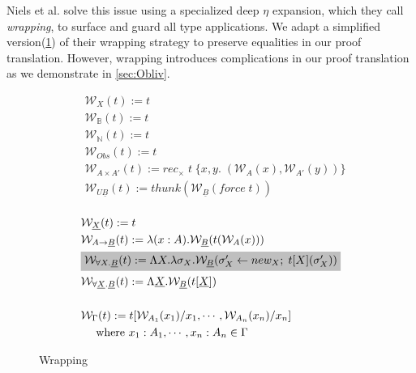 \documentclass[acmsmall]{acmart}
\begin{document}
Niels et al.\cite{NonParam} solve this issue using a specialized deep $\eta$ expansion, which they call \textit{wrapping}, to surface and guard all type applications. We adapt a simplified version(\cref{fig:wrapping}) of their wrapping strategy to preserve equalities in our proof translation. However, wrapping introduces complications in our proof translation as we demonstrate in \cref{sec:Obliv}.

\begin{figure}[H]
  \centering
  \scriptsize
  \begin{minipage}[t]{0.48\textwidth}
    \[
    \begin{aligned}
      &\mathcal{W} _X(t) := t \\
      &\mathcal{W} _\mathbb{B}(t) := t \\
      &\mathcal{W} _\mathbb{N}(t) := t \\
      &\mathcal{W} _{Obs}(t) := t \\
      &\mathcal{W} _{A \times A'}(t) := rec_\times \;t\;\{x,y.\; (\mathcal{W} _A(x),\mathcal{W} _{A'}(y))\} \\
      &\mathcal{W}_{U\underline{B}}(t) := thunk(\mathcal{W} _{\underline{B}}(force\;t)) \\
    \end{aligned}
    \]
  \end{minipage}\hspace{2em}%
  \begin{minipage}[t]{0.48\textwidth}
    \[
    \begin{aligned}
      &\mathcal{W}_{\underline{X}}(t) := t\\
      &\mathcal{W} _{A \rightarrow \underline{B}}(t) := \lambda(x:A).\mathcal{W}_{\underline{B}}(t(\mathcal{W}_A(x))) \\
      &\colorbox{lightgray}{$\mathcal{W}_{\forall X.\underline{B}}(t) := 
      \Lambda X.\lambda \sigma_X.  \mathcal{W}_{\underline{B}}(\sigma_X'\leftarrow new_X;\;t[X](\sigma_X'))$} \\
      &\mathcal{W}_{\forall \underline{X}.\underline{B}}(t) := \Lambda \underline{X}.\mathcal{W}_{\underline{B}}(t[\underline{X}]) \\\\
      &\mathcal{W}_\Gamma(t) := t[\mathcal{W}_{A_1}(x_1)/x_1,\cdots,\mathcal{W}_{A_n}(x_n)/x_n] \\
      &\quad \text{ where } x_1:A_1,\cdots,x_n:A_n \in \Gamma
    \end{aligned}
    \]
  \end{minipage}
  \caption{Wrapping}
  \label{fig:wrapping}
\end{figure}
\end{document}
